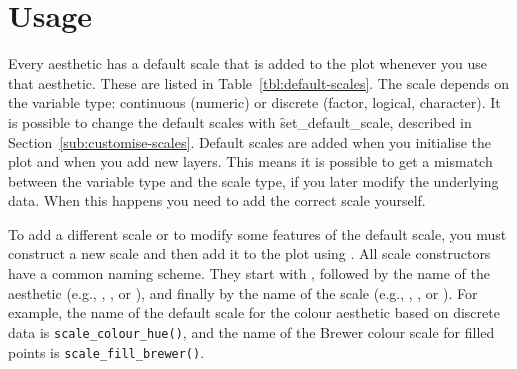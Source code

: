 \section{Usage}
\label{sec:scale-usage}

Every aesthetic has a default scale that is added to the plot whenever you use that aesthetic.  These are listed in Table~\ref{tbl:default-scales}.  The scale depends on the variable type: continuous (numeric) or discrete (factor, logical, character).  It is possible to change the default scales with \f{set_default_scale}, described in Section~\ref{sub:customise-scales}.  Default scales are added when you initialise the plot and when you add new layers.  This means it is possible to get a mismatch between the variable type and the scale type, if you later modify the underlying data.  When this happens you need to add the correct scale yourself.

To add a different scale or to modify some features of the default scale, you must construct a new scale and then add it to the plot using \code{+}. All scale constructors have a common naming scheme.  They start with , followed by the name of the aesthetic (e.g., , , or ), and finally by the name of the scale (e.g., , , or ). For example, the name of the default scale for the colour aesthetic based on discrete data is {\tt scale\_colour\_hue()}, and the name of the Brewer colour scale for filled points is {\tt scale\_fill\_brewer()}.

